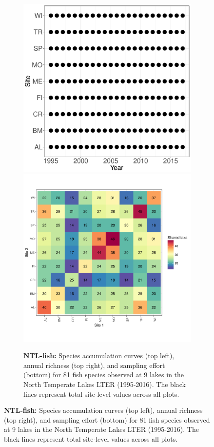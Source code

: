 \documentclass[11pt, oneside]{article}
\begin{document}
\begin{figure}[h!]
\begin{figure}[h!]
\includegraphics[scale = 0.4]{ntl-fish-stanleyLottig_spatiotemporal_sampling_effort.pdf}
\includegraphics[scale = 0.4]{ntl-fish-stanleyLottig_spp_shared.pdf}
\caption{{\bf NTL-fish:} Species accumulation curves (top left),  annual richness (top right), and sampling effort (bottom)  for 81 fish species observed at 9 lakes in the North Temperate Lakes LTER (1995-2016). The black lines represent total site-level values across all plots.}
\label{ntl-fish}
\end{figure}



\end{figure}
\end{document}
